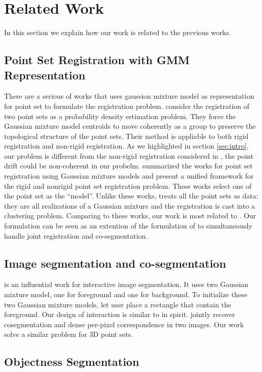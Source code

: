 \section{Related Work}
\label{sec:rw}
In this section we explain how our work is related to the previous works.
\subsection{Point Set Registration with GMM Representation}
\label{subsec:gmmreg}
There are a serious of works that uses gaussion mixture model as representation for point set to formulate the registration problem.
\cite{CPD} consider the registration of two point sets as a probability density estimation problem. They force the Gaussian mixture model centroids to move coherently as a group to preserve the topological structure of the point sets. Their method is appliable to both rigid registration and non-rigid registration. As we highlighted in section \ref{sec:intro}, our problem is different from the non-rigid registration considered in \cite{CPD}, the point drift could be non-coherent in our probelm.\cite{GMM_PAMI} summarized the works for point set registration using Gaussian mixture models and present a unified framework for the rigid and nonrigid point set registration problem. These works select one of the point set as the ``model''. Unlike these works, \cite{Evangelidis2014} treats all the point sets as data: they are all realizations of a Gaussian mixture and the registration is cast into a clustering problem. Comparing to these works, our work is most related to \cite{Evangelidis2014}. Our formulation can be seen as an extention of the formulation of \cite{Evangelidis2014} to simultaneously handle joint registration and co-segmentation.
\subsection{Image segmentation and co-segmentation}
\label{subsec:coseg}
\cite{grabcut} is an influential work for interactive image segmentation. It uses two Gaussian mixture model, one for foreground and one for background. To initialize these two Gaussian mixture models, \cite{grabcut} let user place a rectangle that contain the foreground. Our design of interaction is similar to \cite{grabcut} in spirit.  \cite{Taniai_2016_CVPR} jointly recover cosegmentation and dense per-pixel correspondence in two images. Our work solve a similar problem for 3D point sets.

\subsection{Objectness Segmentation}
\label{subsec:objectness}
\cite{3DReasoningfromBlockstoStability}
\cite{pixelobjectness}